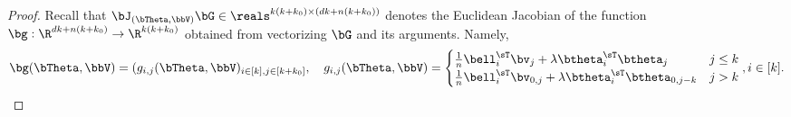 \begin{proof}
Recall that $\bJ_{(\bTheta,\bbV)}\bG\in\reals^{k(k+k_0)\times (dk + n (k+k_0))}$ denotes the Euclidean Jacobian of the function $\bg : \R^{dk + n (k+k_0)} \to \R^{k(k+k_0)}$ obtained from vectorizing $\bG$ and its arguments.
Namely,
\begin{equation}
    \bg(\bTheta,\bbV) = (g_{i,j}(\bTheta,\bbV)_{i\in[k],j\in[k+k_0]},\quad
    g_{i,j}(\bTheta,\bbV) = \begin{cases}
       \frac1n\bell_i^\sT\bv_j  + \lambda \btheta_i^\sT\btheta_j & j \le k\\
       \frac1n\bell_i^\sT\bv_{0,j}  + \lambda \btheta_i^\sT\btheta_{0,j - k} & 
       j  > k
    \end{cases},
    i \in[k].
\end{equation}

\end{proof}

